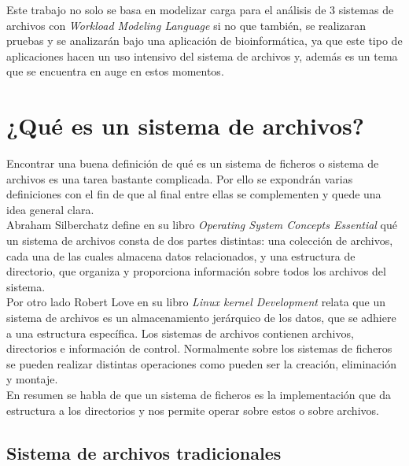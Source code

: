 Este trabajo no solo se basa en modelizar carga para el análisis de 3 sistemas de archivos con \textit{Workload Modeling Language} si no que también, se realizaran pruebas y se analizarán bajo una aplicación de bioinformática, ya que este tipo de aplicaciones hacen un uso intensivo del sistema de archivos y, además es un tema que se encuentra en auge en estos momentos.


\section{¿Qué es un sistema de archivos?}
Encontrar una buena definición de qué es un sistema de ficheros o sistema de archivos es una tarea bastante complicada. Por ello se expondrán varias definiciones con el fin de que al final entre ellas se complementen y quede una idea general clara. \\

Abraham Silberchatz define en su libro \textit{Operating System Concepts Essential} \cite{silberchatz} qué un sistema de archivos consta de dos partes distintas: una colección de archivos, cada una de las cuales almacena datos relacionados, y una estructura de directorio, que organiza y proporciona información sobre todos los archivos del sistema.\\

Por otro lado Robert Love en su libro \textit{Linux kernel Development} \cite{LinuxKernelDev} relata que un sistema de archivos es un almacenamiento jerárquico de los datos, que se adhiere a una estructura específica. Los sistemas de archivos contienen archivos, directorios e información de control. Normalmente sobre los sistemas de ficheros se pueden realizar distintas operaciones como pueden ser la creación, eliminación y montaje.\\

En resumen se habla de que un sistema de ficheros es la implementación que da estructura a los directorios y nos permite operar sobre estos o sobre archivos.

\subsection{Sistema de archivos tradicionales}


